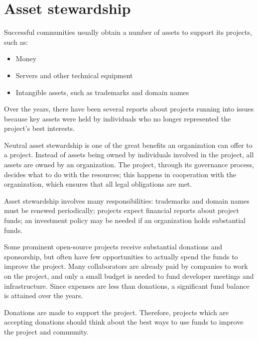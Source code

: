 


\chapter{Asset stewardship}

Successful communities usually obtain a number of assets to support its projects, such as:

\begin{itemize}

\item Money

\item Servers and other technical equipment

\item Intangible assets, such as trademarks and domain names

\end{itemize}

Over the years, there have been several reports about projects running into issues because key assets were held by individuals who no longer represented the project's best interests.

Neutral asset stewardship is one of the great benefits an organization can offer to a project.  Instead of assets being owned by individuals involved in the project, all assets are owned by an organization.  The project, through its governance process, decides what to do with the resources; this happens in cooperation with the organization, which ensures that all legal obligations are met.

Asset stewardship involves many responsibilities: trademarks and domain names must be renewed periodically; projects expect financial reports about project funds; an investment policy may be needed if an organization holds substantial funds.

\begin{kaobox}[frametitle=Projects with big balances]

Some prominent open-source projects receive substantial donations and sponsorship, but often have few opportunities to actually spend the funds to improve the project.  Many collaborators are already paid by companies to work on the project, and only a small budget is needed to fund developer meetings and infrastructure.  Since expenses are less than donations, a significant fund balance is attained over the years.

Donations are made to support the project.  Therefore, projects which are accepting donations should think about the best ways to use funds to improve the project and community.

\end{kaobox}

